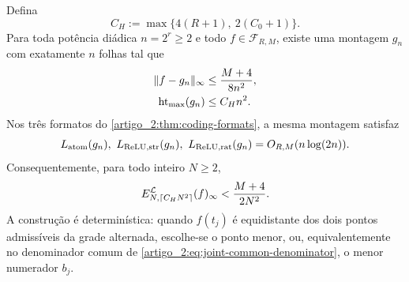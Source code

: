 \begin{theorem}\label{map:artigo_2:3.16}
\label{artigo_2:thm:joint-budget}
Defina
\begin{equation}
 C_H:=\max\{4(R+1),\ 2(C_0+1)\}.
 \label{artigo_2:eq:joint-height-constant}
\end{equation}
Para toda potência diádica $n=2^r\ge2$ e todo
$f\in\mathcal F_{R,M}$, existe uma montagem $g_n$ com exatamente $n$
folhas tal que
\begin{align}
 \|f-g_n\|_\infty
 &\le\frac{M+4}{8n^2},
 \label{artigo_2:eq:joint-dyadic-error}\\
 \operatorname{ht}_{\max}(g_n)&\le C_Hn^2.
 \label{artigo_2:eq:joint-dyadic-height}
\end{align}
Nos três formatos do \cref{artigo_2:thm:coding-formats}, a mesma montagem satisfaz
\begin{equation}
 L_{\rm atom}(g_n),\ L_{\rm ReLU,str}(g_n),\
 L_{\rm ReLU,rat}(g_n)=O_{R,M}(n\log(2n)).
 \label{artigo_2:eq:joint-dyadic-bits}
\end{equation}
Consequentemente, para todo inteiro $N\ge2$,
\begin{equation}
 E_{N,\lceil C_HN^2\rceil}^{\mathcal{L}}(f)_\infty
 <\frac{M+4}{2N^2}.
 \label{artigo_2:eq:joint-all-N}
\end{equation}
A construção é determinística: quando $f(t_j)$ é equidistante dos dois
pontos admissíveis da grade alternada, escolhe-se o ponto menor, ou,
equivalentemente no denominador comum de \eqref{artigo_2:eq:joint-common-denominator},
o menor numerador $b_j$.
\end{theorem}

